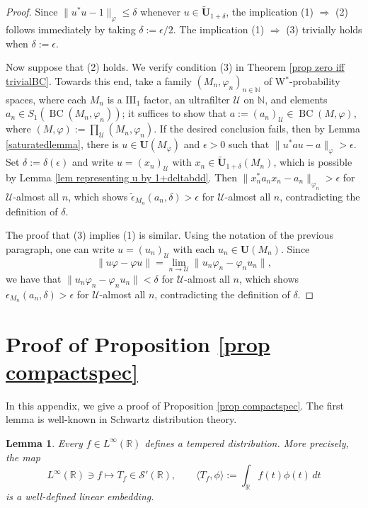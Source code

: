 \documentclass[12pt]{amsart}
\newtheorem{lem}[thm]{Lemma}
\theoremstyle{definition}
\def\bb{\mathbb}
\def\bb{\mathbb}
\def\u{\mathsf 1}
\def \u{\mathcal U}
\def\BC{\operatorname{BC}}
\begin{document}
\begin{proof}
Since $\|u^*u-1\|_\varphi\leq \delta$ whenever $u\in \tilde{\mathbf{U}}_{1+\delta}$, the implication (1) $\Rightarrow$ (2) follows immediately by taking $\delta:=\epsilon/2$.  The implication (1) $\Rightarrow$ (3) trivially holds when $\delta:=\epsilon$.

Now suppose that (2) holds.  We verify condition (3) in Theorem \ref{prop zero iff trivialBC}.  Towards this end, take a family $(M_n,\varphi_n)_{n\in \bb N}$ of W$^*$-probability spaces, where each $M_n$ is a $\mathrm{III}_1$ factor, an ultrafilter $\u$ on $\bb N$, and elements $a_n\in S_1(\BC(M_n,\varphi_n))$; it suffices to show that $a:=(a_n)_\u\in \BC(M,\varphi)$, where $(M,\varphi):=\prod_\u (M_n,\varphi_n)$.  If the desired conclusion fails, then by Lemma \ref{saturatedlemma}, there is $u\in \mathbf{U}(M_\varphi)$ and $\epsilon>0$ such that $\|u^*au-a\|_\varphi>\epsilon$.  Set $\delta:=\delta(\epsilon)$ and write $u=(x_n)_\u$ with $x_n\in \tilde{\mathbf{U}}_{1+\delta}(M_n)$, which is possible by Lemma \ref{lem representing u by 1+deltabdd}.  Then $\|x_n^*a_nx_n-a_n\|_{\varphi_n}>\epsilon$ for $\u$-almost all $n$, which shows $\tilde{\epsilon}_{M_n}(a_n,\delta)> \epsilon$ for $\u$-almost all $n$, contradicting the definition of $\delta$.

The proof that (3) implies (1) is similar.  Using the notation of the previous paragraph, one can write $u=(u_n)_\u$ with each $u_n\in \mathbf{U}(M_n)$.  Since $$\|u\varphi-\varphi u\|=\lim_{n\to \u}\|u_n\varphi_n-\varphi_n u_n\|,$$ we have that $\|u_n\varphi_n-\varphi_n u_n\|<\delta$ for $\u$-almost all $n$, which shows $\epsilon_{M_n}(a_n,\delta)> \epsilon$ for $\u$-almost all $n$, contradicting the definition of $\delta$.
\end{proof}

\appendix 
\section{Proof of Proposition \ref{prop compactspec}}\label{appendixA}
In this appendix, we give a proof of Proposition \ref{prop compactspec}. 
The first lemma is well-known in Schwartz distribution theory. 
\begin{lem}\label{lem Linfty is tempered}
Every $f\in L^\infty(\mathbb R)$ defines a tempered distribution. More precisely,
the map
\[
L^\infty(\mathbb R)\ni f \longmapsto T_f\in \mathcal S'(\mathbb R),
\qquad
\langle T_f,\phi\rangle:=\int_{\mathbb R} f(t)\phi(t)\,dt
\]
is a well-defined linear embedding.
\end{lem}
\end{document}
